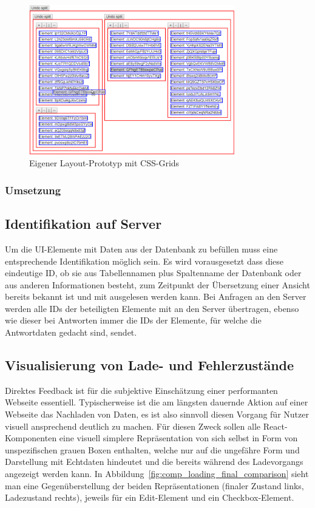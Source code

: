 \begin{figure}
    \centering
    \captionsetup{justification=centering}
    \includegraphics[width=0.8\textwidth]{figures/layout_grid_test.png}
        \caption{Eigener Layout-Prototyp mit CSS-Grids}\label{fig:layout_grid_test}
\end{figure}

\subsubsection{Umsetzung}\label{subsec:layout}

\subsection{Identifikation auf Server}
Um die UI-Elemente mit Daten aus der Datenbank zu befüllen muss eine entsprechende Identifikation möglich sein. Es wird vorausgesetzt dass diese eindeutige ID, ob sie aus Tabellennamen plus Spaltenname der Datenbank oder aus anderen Informationen besteht, zum Zeitpunkt der Übersetzung einer Ansicht bereits bekannt ist und mit ausgelesen werden kann. Bei Anfragen an den Server werden alle IDs der beteiligten Elemente mit an den Server übertragen, ebenso wie dieser bei Antworten immer die IDs der Elemente, für welche die Antwortdaten gedacht sind, sendet.

\subsection{Visualisierung von Lade- und Fehlerzustände}\label{subsec:loading_state_section}
Direktes Feedback ist für die subjektive Einschätzung einer performanten Webseite essentiell. Typischerweise ist die am längsten dauernde Aktion auf einer Webseite das Nachladen von Daten, es ist also sinnvoll diesen Vorgang für Nutzer visuell ansprechend deutlich zu machen. Für diesen Zweck sollen alle React-Komponenten eine visuell simplere Repräsentation von sich selbst in Form von unspezifischen grauen Boxen enthalten, welche nur auf die ungefähre Form und Darstellung mit Echtdaten hindeutet und die bereits während des Ladevorgangs angezeigt werden kann. In Abbildung~\ref{fig:comp_loading_final_comparison} sieht man eine Gegenüberstellung der beiden Repräsentationen (finaler Zustand links, Ladezustand rechts), jeweils für ein Edit-Element und ein Checkbox-Element.

